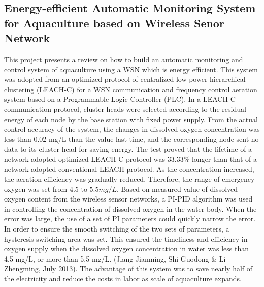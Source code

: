 \documentclass[12pt]{article}
\begin{document}
			\subsection*{Energy-efficient Automatic Monitoring System for Aquaculture based on Wireless Senor Network }
				This project presents a review on how to build an automatic monitoring and control system of aquaculture using a WSN which is energy efficient. This system was adopted from an optimized protocol of centralized low-power hierarchical clustering (LEACH-C) for a WSN communication and frequency control aeration system based on a Programmable Logic Controller (PLC). In a LEACH-C communication protocol, cluster heads were selected according to the residual energy of each node by the base station with fixed power supply. From the actual control accuracy of the system, the changes in dissolved oxygen concentration was less than 0.02 mg/L than the value last time, and the corresponding node sent no data to its cluster head for saving energy. The test proved that the lifetime of a network adopted optimized LEACH-C protocol was 33.33\% longer than that of a network adopted conventional LEACH protocol. As the concentration increased, the aeration efficiency was gradually reduced. Therefore, the range of emergency oxygen was set from 4.5 to $5.5 mg/L$. Based on measured value of dissolved oxygen content from the wireless sensor networks, a PI-PID algorithm was used in controlling the concentration of dissolved oxygen in the water body. When the error was large, the use of a set of PI parameters could quickly narrow the error. In order to ensure the smooth switching of the two sets of parameters, a hysteresis switching area was set. This ensured the timeliness and efficiency in oxygen supply when the dissolved oxygen concentration in water was less than 4.5 mg/L, or more than 5.5 mg/L. (Jiang Jianming, Shi Guodong \& Li Zhengming, July 2013). The advantage of this system was to save nearly half of the electricity and reduce the costs in labor as scale of aquaculture expands.
\end{document}
